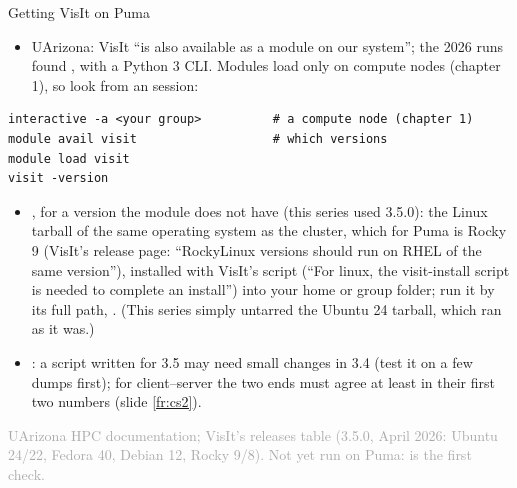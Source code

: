 \documentclass[aspectratio=169,11pt]{beamer}
\newcommand{\sourcecredit}[1]{\vfill\begin{flushright}\tiny\textcolor{DarkGray}{#1}\end{flushright}}
\begin{document}
\begin{frame}[fragile]{Getting VisIt on Puma}
\label{fr:get}
\footnotesize
\begin{itemize}\setlength{\itemsep}{1pt}
  \item {} UArizona: VisIt ``is also available as a module on our system''; the 2026 runs found , with a Python 3 CLI. Modules load only on compute nodes (chapter 1), so look from an  session:
\end{itemize}
\begin{lstlisting}[style=shell]
interactive -a <your group>          # a compute node (chapter 1)
module avail visit                   # which versions
module load visit
visit -version
\end{lstlisting}
\begin{itemize}\setlength{\itemsep}{1pt}
  \item {}, for a version the module does not have (this series used 3.5.0): the Linux tarball of the same operating system as the cluster, which for Puma is Rocky 9 (VisIt's release page: ``RockyLinux versions should run on RHEL of the same version''), installed with VisIt's  script (``For linux, the visit-install script is needed to complete an install'') into your home or group folder; run it by its full path, . (This series simply untarred the Ubuntu 24 tarball, which ran as it was.)
  \item {}: a script written for 3.5 may need small changes in 3.4 (test it on a few dumps first); for client--server the two ends must agree at least in their first two numbers (slide \ref{fr:cs2}).
\end{itemize}
\sourcecredit{UArizona HPC documentation; VisIt's releases table (3.5.0, April 2026: Ubuntu 24/22, Fedora 40, Debian 12, Rocky 9/8). Not yet run on Puma: \code{module avail visit} is the first check.}
\end{frame}
\end{document}
